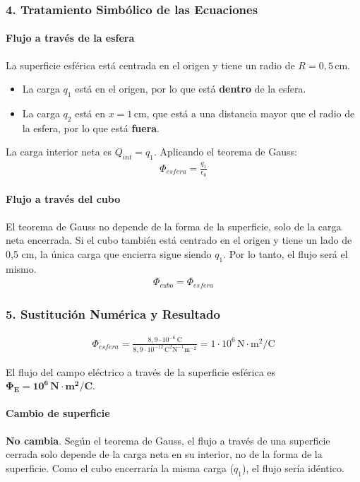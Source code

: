 \subsubsection*{4. Tratamiento Simbólico de las Ecuaciones}
\paragraph*{Flujo a través de la esfera}
La superficie esférica está centrada en el origen y tiene un radio de $R=0,5\,\text{cm}$.
\begin{itemize}
    \item La carga $q_1$ está en el origen, por lo que está \textbf{dentro} de la esfera.
    \item La carga $q_2$ está en $x=1\,\text{cm}$, que está a una distancia mayor que el radio de la esfera, por lo que está \textbf{fuera}.
\end{itemize}
La carga interior neta es $Q_{int} = q_1$. Aplicando el teorema de Gauss:
\begin{gather}
    \Phi_{esfera} = \frac{q_1}{\epsilon_0}
\end{gather}
\paragraph*{Flujo a través del cubo}
El teorema de Gauss no depende de la forma de la superficie, solo de la carga neta encerrada. Si el cubo también está centrado en el origen y tiene un lado de 0,5 cm, la única carga que encierra sigue siendo $q_1$. Por lo tanto, el flujo será el mismo.
\begin{gather}
    \Phi_{cubo} = \Phi_{esfera}
\end{gather}

\subsubsection*{5. Sustitución Numérica y Resultado}
\begin{gather}
    \Phi_{esfera} = \frac{8,9\cdot10^{-6}\,\text{C}}{8,9\cdot10^{-12}\,\text{C}^2\text{N}^{-1}\text{m}^{-2}} = 1\cdot10^6 \, \text{N}\cdot\text{m}^2/\text{C}
\end{gather}
\begin{cajaresultado}
    El flujo del campo eléctrico a través de la superficie esférica es $\boldsymbol{\Phi_E = 10^6\,\textbf{N}\cdot\textbf{m}^2/\textbf{C}}$.
\end{cajaresultado}

\paragraph*{Cambio de superficie}
\newpage
\begin{cajaresultado}
    \textbf{No cambia}. Según el teorema de Gauss, el flujo a través de una superficie cerrada solo depende de la carga neta en su interior, no de la forma de la superficie. Como el cubo encerraría la misma carga ($q_1$), el flujo sería idéntico.
\end{cajaresultado}


